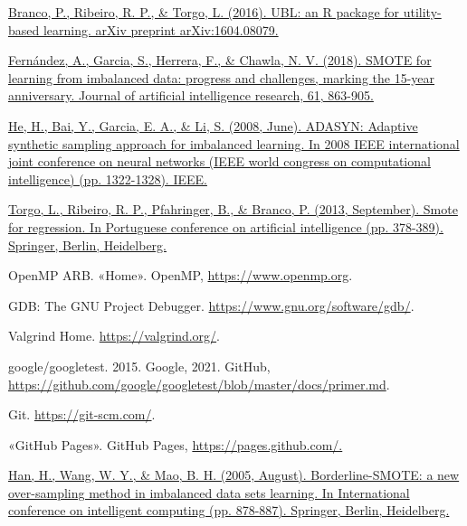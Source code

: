 \begin{thebibliography}{9}

	\href{https://web.cs.dal.ca/~branco/PDFfiles/j3.pdf}{Branco, P., Ribeiro, R. P., \& Torgo, L. (2016). UBL: an R package for utility-based learning. arXiv preprint arXiv:1604.08079.}



	\href{https://www.jair.org/index.php/jair/article/view/11192}{Fernández, A., Garcia, S., Herrera, F., \& Chawla, N. V. (2018). SMOTE for learning from imbalanced data: progress and challenges, marking the 15-year anniversary. Journal of artificial intelligence research, 61, 863-905.}


	\href{https://ieeexplore.ieee.org/abstract/document/4633969}{He, H., Bai, Y., Garcia, E. A., \& Li, S. (2008, June). ADASYN: Adaptive synthetic sampling approach for imbalanced learning. In 2008 IEEE international joint conference on neural networks (IEEE world congress on computational intelligence) (pp. 1322-1328). IEEE.}



	\href{https://link.springer.com/chapter/10.1007/978-3-642-40669-0_33}{Torgo, L., Ribeiro, R. P., Pfahringer, B., \& Branco, P. (2013, September). Smote for regression. In Portuguese conference on artificial intelligence (pp. 378-389). Springer, Berlin, Heidelberg. }





	OpenMP ARB. «Home». OpenMP, \url{https://www.openmp.org}.


	GDB: The GNU Project Debugger. \url{https://www.gnu.org/software/gdb/}.


	Valgrind Home. \url{https://valgrind.org/}.


	google/googletest. 2015. Google, 2021. GitHub, \url{https://github.com/google/googletest/blob/master/docs/primer.md}.


	Git. \url{https://git-scm.com/}.


	«GitHub Pages». GitHub Pages, \url{https://pages.github.com/.}


	\href{https://link.springer.com/chapter/10.1007/11538059_91}{Han, H., Wang, W. Y., \& Mao, B. H. (2005, August). Borderline-SMOTE: a new over-sampling method in imbalanced data sets learning. In International conference on intelligent computing (pp. 878-887). Springer, Berlin, Heidelberg.}


\end{thebibliography}
